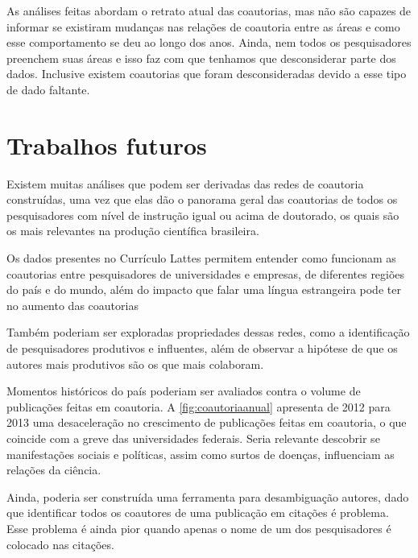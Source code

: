 As análises feitas abordam o retrato atual das coautorias, mas não são capazes de informar se existiram mudanças nas relações de coautoria entre as áreas e como esse comportamento se deu ao longo dos anos. Ainda, nem todos os pesquisadores preenchem suas áreas e isso faz com que tenhamos que desconsiderar parte dos dados. Inclusive existem coautorias que foram desconsideradas devido a esse tipo de dado faltante.

\section{Trabalhos futuros}

Existem muitas análises que podem ser derivadas das redes de coautoria construídas, uma vez que elas dão o panorama geral das coautorias de todos os pesquisadores com nível de instrução igual ou acima de doutorado, os quais são os mais relevantes na produção científica brasileira.

Os dados presentes no Currículo Lattes permitem entender como funcionam as coautorias entre pesquisadores de universidades e empresas, de diferentes regiões do país e do mundo, além do impacto que falar uma língua estrangeira pode ter no aumento das coautorias

Também poderiam ser exploradas propriedades dessas redes, como a identificação de pesquisadores produtivos e influentes, além de observar a hipótese de que os autores mais produtivos são os que mais colaboram.

Momentos históricos do país poderiam ser avaliados contra o volume de publicações feitas em coautoria. A \autoref{fig:coautoriaanual} apresenta de 2012 para 2013 uma desaceleração no crescimento de publicações feitas em coautoria, o que coincide com a greve das universidades federais. Seria relevante descobrir se manifestações sociais e políticas, assim como surtos de doenças, influenciam as relações da ciência.

Ainda, poderia ser construída uma ferramenta para desambiguação autores, dado que identificar todos os coautores de uma publicação em citações é problema. Esse problema é ainda pior quando apenas o nome de um dos pesquisadores é colocado nas citações.
